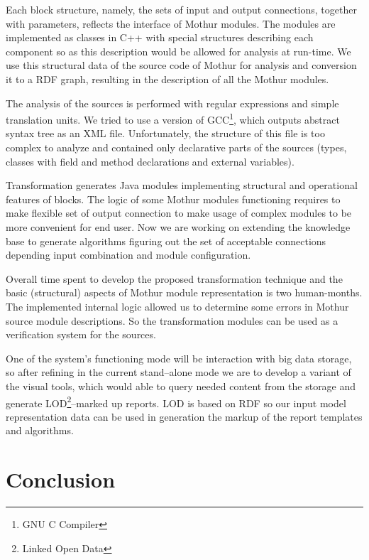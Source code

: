 \documentclass[conference]{IEEEtran}
\begin{document}
Each block structure, namely, the sets of input and output connections, together with parameters, reflects the interface of Mothur modules.  The modules are implemented as classes in C++ with special structures describing each component so as this description would be allowed for analysis at run-time.  We use this structural data of the source code of Mothur for analysis and conversion it to a RDF graph, resulting in the description of all the Mothur modules.

The analysis of the sources is performed with regular expressions and simple translation units.  We tried to use a version of GCC\footnote{GNU C Compiler}, which outputs abstract syntax tree as an XML file.  Unfortunately, the structure of this file is too complex to analyze and contained only declarative parts of the sources (types, classes with field and method declarations and external variables).

Transformation generates Java modules implementing structural and operational features of blocks.  The logic of some Mothur modules functioning requires to make flexible set of output connection to make usage of complex modules to be more convenient for end user. Now we are working on extending the knowledge base to generate algorithms figuring out the set of acceptable connections depending input combination and module configuration.

Overall time spent to develop the proposed transformation technique and the basic (structural) aspects of Mothur module representation is two human-months.  The implemented internal logic allowed us to determine some errors in Mothur source module descriptions.  So the transformation modules can be used as a verification system for the sources.

One of the system's functioning mode will be interaction with big data storage, so after refining in the current stand--alone mode we are to develop a variant of the visual tools, which would able to query needed content from the storage and generate LOD\footnote{Linked Open Data}--marked up reports.  LOD is based on RDF so our input model representation data can be used in generation the markup of the report templates and algorithms.

\section{Conclusion}

\end{document}

